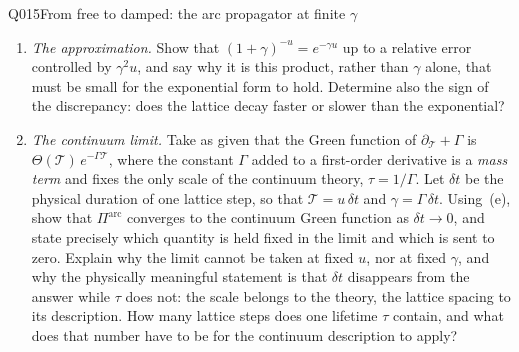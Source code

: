 \begin{entry}{Q015}{From free to damped: the arc propagator at finite $\gamma$}
\begin{problem}
\begin{enumerate}[label=\textbf{(\alph*)},leftmargin=*]
        Explain why this is the expected structure rather than a coincidence, by reading
        it off the equation $\Pi^{\mathrm{arc}}=\bigl[(1+\gamma)\id-T\bigr]^{-1}$ that
        (c) establishes: each application of $T$ advances both branches by one step of
        the dynamics, and each such step is accompanied by the same factor. What
        property of the underlying dynamics does this memorylessness reflect, and what
        would have to change for the loss per step to depend on $\bar n_2-\bar n_1$?


  \item \emph{The approximation.} Show that $(1+\gamma)^{-u}=e^{-\gamma u}$ up to a
        relative error controlled by $\gamma^{2}u$, and say why it is this product,
        rather than $\gamma$ alone, that must be small for the exponential form to hold. Determine also the sign of
        the discrepancy: does the lattice decay faster or slower than the exponential?

  \item \emph{The continuum limit.} Take as given that the Green function of
        $\partial_{\mathcal T}+\Gamma$ is $\Theta(\mathcal T)\,e^{-\Gamma\mathcal T}$,
        where the constant $\Gamma$ added to a first-order derivative is a \emph{mass
        term} and fixes the only scale of the continuum theory, $\tau=1/\Gamma$. Let
        $\delta t$ be the physical duration of one lattice step, so that
        $\mathcal T=u\,\delta t$ and $\gamma=\Gamma\,\delta t$. Using~(e), show that
        $\Pi^{\mathrm{arc}}$ converges to the continuum Green function as
        $\delta t\to0$, and state precisely which quantity is held fixed in the limit
        and which is sent to zero. Explain why the limit cannot be taken at fixed $u$,
        nor at fixed $\gamma$, and why the physically meaningful statement is that
        $\delta t$ disappears from the answer while $\tau$ does not: the scale belongs
        to the theory, the lattice spacing to its description. How many lattice steps
        does one lifetime $\tau$ contain, and what does that number have to be for the
        continuum description to apply?
\end{enumerate}
\end{problem}



\end{entry}
